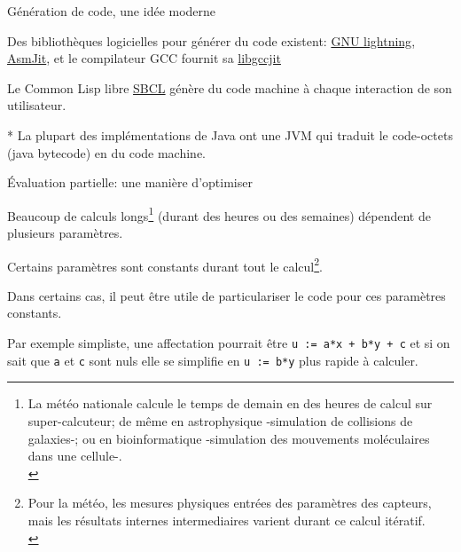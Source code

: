 \documentclass[final,a4,xcolor={svgnames,dvipsnames}]{beamer}
\begin{document}
 \begin{frame}{Génération de code, une idée moderne}

  Des bibliothèques logicielles pour générer du code existent:
  \href{https://www.gnu.org/software/lightning/}{GNU lightning},
  \href{https://asmjit.com/}{AsmJit}, et le compilateur GCC fournit sa
  \href{https://gcc.gnu.org/onlinedocs/jit/}{libgccjit}

  \bigskip
  
  Le Common Lisp libre \href{https://sbcl.org/}{SBCL} génère du code
  machine à chaque interaction de son utilisateur.

  \bigskip
  *
  La plupart des implémentations de Java ont une JVM qui traduit le code-octets (java bytecode) en du code machine.

 \end{frame}

 \begin{frame}{Évaluation partielle: une manière d'optimiser}

Beaucoup de calculs longs\footnote{La météo nationale calcule le temps
de demain en des heures de calcul sur super-calcuteur; de même en
astrophysique -simulation de collisions de galaxies-; ou en
bioinformatique -simulation des mouvements moléculaires dans une
cellule-.\\} (durant des heures ou des semaines) dépendent de plusieurs
paramètres.
\medskip

Certains paramètres sont constants durant tout le calcul\footnote{Pour
la météo, les mesures physiques entrées des paramètres des capteurs,
mais les résultats internes intermediaires varient durant ce calcul
itératif.\\}.
\medskip

Dans certains cas, il peut être utile de particulariser le code pour ces paramètres constants.

Par exemple simpliste, une affectation pourrait être \texttt{u := a*x
  + b*y + c} et si on sait que \texttt{a} et \texttt{c} sont nuls elle
se simplifie en \texttt{u := b*y} plus rapide à calculer.


 \end{frame}
\end{document}
